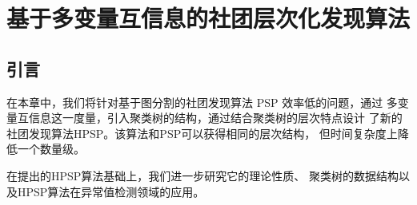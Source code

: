 
\chapter{基于多变量互信息的社团层次化发现算法}\label{chap:info_clustering}
\section{引言}
在本章中，我们将针对基于图分割的社团发现算法 PSP 效率低的问题，通过
多变量互信息这一度量，引入聚类树的结构，通过结合聚类树的层次特点设计
了新的社团发现算法HPSP。该算法和PSP可以获得相同的层次结构，
但时间复杂度上降低一个数量级。

在提出的HPSP算法基础上，我们进一步研究它的理论性质、
聚类树的数据结构以及HPSP算法在异常值检测领域的应用。


